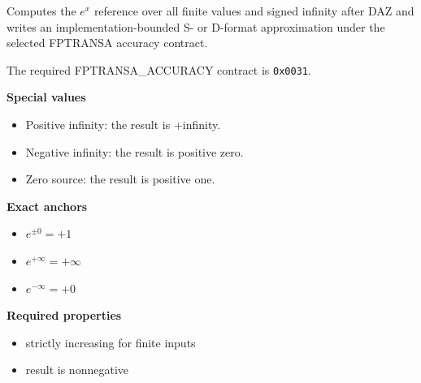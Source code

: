 Computes the $e^x$ reference over all finite values and signed infinity after DAZ and writes an implementation-bounded S- or D-format approximation under the selected FPTRANSA accuracy contract.

The required FPTRANSA\_ACCURACY contract is \texttt{0x0031}.

\textbf{Special values}\par
\begin{itemize}
\item Positive infinity: the result is +infinity.
\item Negative infinity: the result is positive zero.
\item Zero source: the result is positive one.
\end{itemize}

\textbf{Exact anchors}\par
\begin{itemize}
\item $e^{\mathord{\pm}0} = +1$
\item $e^{+\infty} = +\infty$
\item $e^{-\infty} = +0$
\end{itemize}

\textbf{Required properties}\par
\begin{itemize}
\item strictly increasing for finite inputs
\item result is nonnegative
\end{itemize}
